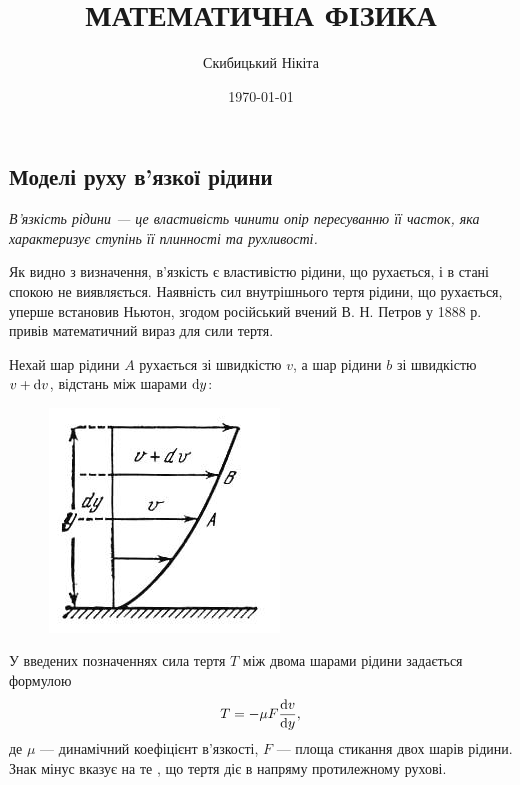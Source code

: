 

\title{{\Huge МАТЕМАТИЧНА ФІЗИКА}}
\author{Скибицький Нікіта}
\date{\today}





\tableofcontents

\setcounter{section}{3}
\setcounter{subsection}{3}
\setcounter{subsubsection}{13}
\setcounter{theorem}{19}
\setcounter{equation}{107}

\subsection{Моделі руху в'язкої рідини}

\begin{definition}
	\it{В'язкість рідини} --- це властивість чинити опір пересуванню її часток, яка характеризує ступінь її плинності та рухливості.
\end{definition}

Як видно з визначення, в'язкість є властивістю рідини, що рухається, і в стані спокою не виявляється. Наявність сил внутрішнього тертя рідини, що рухається, уперше встановив Ньютон, згодом російський вчений В. Н. Петров у 1888 р. привів математичний вираз для сили тертя. \medskip

Нехай шар рідини $A$ рухається зі швидкістю $v$, а шар рідини $b$ зі швидкістю $v + \mathop{}\!\mathrm{d} v$, відстань між шарами $\mathop{}\!\mathrm{d} y$:
\begin{figure}[H]
	\centering
	\includegraphics[]{img/12-1.png}
\end{figure}

У введених позначеннях сила тертя $T$ між двома шарами рідини задається формулою
\begin{equation}
	T = - \mu F\frac{\mathop{}\!\mathrm{d} v}{\mathop{}\!\mathrm{d} y},
\end{equation}
де $\mu$ --- динамічний коефіцієнт в'язкості, $F$ --- площа стикання двох шарів рідини. Знак мінус вказує на те , що тертя діє в напряму протилежному рухові. \medskip

